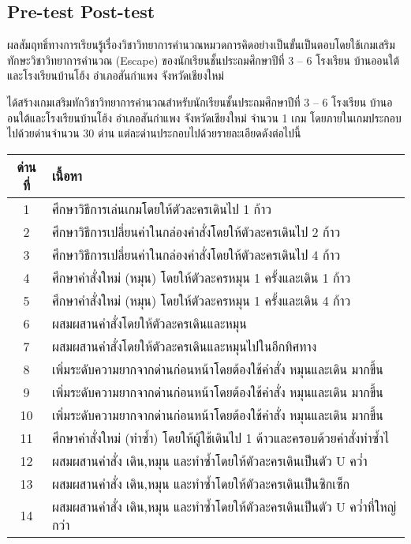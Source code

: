 \subsection{Pre-test Post-test}
ผลสัมฤทธิ์ทางการเรียนรู้เรื่องวิชาวิทยาการคำนวณหมวดการคิดอย่างเป็นขั้นเป็นตอบโดยใช้เกมเสริมทักษะวิชาวิทยาการคำนวณ (Escape) ของนักเรียนชั้นประถมศึกษาปีที่ 3 – 6
โรงเรียน บ้านออนใต้และโรงเรียนบ้านโฮ้ง อำเภอสันกำแพง จังหวัดเชียงใหม่\par
ได้สร้างเกมเสริมทักวิชาวิทยาการคำนวณสำหรับนักเรียนชั้นประถมศึกษาปีที่ 3 – 6 โรงเรียน บ้านออนใต้และโรงเรียนบ้านโฮ้ง อำเภอสันกำแพง จังหวัดเชียงใหม่ จำนวน 1 เกม โดยภายในเกมประกอบไปด้วยด่านจำนวน 30 ด่าน
แต่ละด่านประกอบไปด้วยรายละเอียดดังต่อไปนี้
\begin{center}
    \begin{tabular}{|c | m{35em}|} 
     \hline
     ด่านที่ & เนื้อหา\\ [0.5ex] 
     \hline\hline
     1 &  ศึกษาวิธีการเล่นเกมโดยให้ตัวละครเดินไป 1 ก้าว \\ 
     \hline
     2 &  ศึกษาวิธีการเปลี่ยนค่าในกล่องคำสั่งโดยให้ตัวละครเดินไป 2 ก้าว \\ 
     \hline
     3 &  ศึกษาวิธีการเปลี่ยนค่าในกล่องคำสั่งโดยให้ตัวละครเดินไป 4 ก้าว \\ 
     \hline
     4 &  ศึกษาคำสั่งใหม่ (หมุน) โดยให้ตัวละครหมุน 1 ครั้งและเดิน 1 ก้าว \\ 
     \hline
     5 &  ศึกษาคำสั่งใหม่ (หมุน) โดยให้ตัวละครหมุน 1 ครั้งและเดิน 4 ก้าว \\ 
     \hline
     6 &  ผสมผสานคำสั่งโดยให้ตัวละครเดินและหมุน \\ 
     \hline
     7 &  ผสมผสานคำสั่งโดยให้ตัวละครเดินและหมุนไปในอีกทิศทาง \\ 
     \hline
     8 &  เพิ่มระดับความยากจากด่านก่อนหน้าโดยต้องใช้คำสั่ง หมุนและเดิน มากขึ้น \\ 
     \hline
     9 &  เพิ่มระดับความยากจากด่านก่อนหน้าโดยต้องใช้คำสั่ง หมุนและเดิน มากขึ้น \\ 
     \hline
     10 &  เพิ่มระดับความยากจากด่านก่อนหน้าโดยต้องใช้คำสั่ง หมุนและเดิน มากขึ้น \\ 
     \hline
     11 &  ศึกษาคำสั่งใหม่ (ทำซ้ำ) โดยให้ผู้ใช้เดินไป 1 ด้าวและครอบด้วยคำสั่งทำซ้ำไ \\ 
     \hline
     12 &  ผสมผสานคำสั่ง เดิน,หมุน และทำซ้ำโดยให้ตัวละครเดินเป็นตัว U คว่ำ \\ 
     \hline
     13 &  ผสมผสานคำสั่ง เดิน,หมุน และทำซ้ำโดยให้ตัวละครเดินเป็นซิกเซ็ก \\ 
     \hline
     14 &  ผสมผสานคำสั่ง เดิน,หมุน และทำซ้ำโดยให้ตัวละครเดินเป็นตัว U คว่ำที่ใหญ่กว่า \\ 

\end{tabular}
\end{center}
